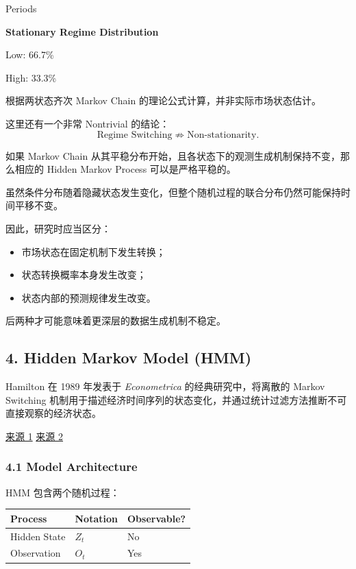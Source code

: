 Periods

\textbf{Stationary Regime Distribution}

Low: 66.7\%

High: 33.3\%

根据两状态齐次 Markov Chain 的理论公式计算，并非实际市场状态估计。

这里还有一个非常 Nontrivial 的结论：
\[\boxed{
\text{Regime Switching}
\not\Rightarrow
\text{Non-stationarity}.
}\]

如果 Markov Chain 从其平稳分布开始，且各状态下的观测生成机制保持不变，那么相应的 Hidden Markov Process 可以是严格平稳的。

虽然条件分布随着隐藏状态发生变化，但整个随机过程的联合分布仍然可能保持时间平移不变。

因此，研究时应当区分：

\begin{itemize}
\tightlist
\item
  市场状态在固定机制下发生转换；
\item
  状态转换概率本身发生改变；
\item
  状态内部的预测规律发生改变。
\end{itemize}

后两种才可能意味着更深层的数据生成机制不稳定。

\hypertarget{part-4-77-0001-hidden-markov-model-hmm}{%
\subsection{4. Hidden Markov Model (HMM)}\label{part-4-77-0001-hidden-markov-model-hmm}}

Hamilton 在 1989 年发表于 \emph{Econometrica} 的经典研究中，将离散的 Markov Switching 机制用于描述经济时间序列的状态变化，并通过统计过滤方法推断不可直接观察的经济状态。

\href{https://www.academia.edu/787023/A_new_approach_to_the_economic_analysis_of_nonstationary_time_series_and_the_business_cycle}{来源 1} \href{https://ideas.repec.org/a/ecm/emetrp/v57y1989i2p357-84.html}{来源 2}

\hypertarget{part-4-77-0001-model-architecture}{%
\subsubsection{4.1 Model Architecture}\label{part-4-77-0001-model-architecture}}

HMM 包含两个随机过程：

\begin{readertable}
\begin{longtable}[]{@{}
  >{\raggedright\arraybackslash}p{}
  >{\raggedright\arraybackslash}p{}
  >{\raggedright\arraybackslash}p{}@{}}
\toprule
Process & Notation & Observable? \\
\midrule
\endhead
Hidden State & \(Z_t\) & No \\
Observation & \(O_t\) & Yes \\
\bottomrule
\end{longtable}
\end{readertable}

